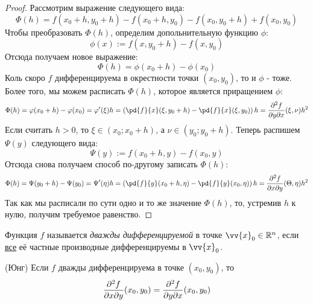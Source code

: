 \begin{proof}
	Рассмотрим выражение следующего вида:
	\[
		\Phi (h) = f(x_0 + h, y_0 + h) - f(x_0 + h, y_0) - f(x_0, y_0 + h) + f(x_0, y_0)
	\]
	Чтобы преобразовать $\Phi(h)$, определим допольнительную функцию $\phi$:
	\[
		\phi(x) := f(x, y_0 + h) - f(x, y_0)
	\]
	Отсюда получаем новое выражение:
	\[
		\Phi(h) = \phi(x_0 + h) - \phi(x_0)
	\]
	Коль скоро $f$ дифференцируема в окрестности точки $(x_0, y_0)$, то и $\phi$ - тоже. Более того, мы можем расписать $\Phi(h)$, которое является приращением $\phi$:
	\[
		\Phi(h) = \phi(x_0 + h) - \phi(x_0) = \phi'(\xi) h = \left(\pd{f}{x} (\xi, y_0 + h) - \pd{f}{x} (\xi, y_0)\right) h = \frac{\vdelta^2 f}{\vdelta y \vdelta x} (\xi, \nu) h^2
	\]
	Если считать $h > 0$, то $\xi \in (x_0; x_0 + h)$, а $\nu \in (y_0; y_0 + h)$. Теперь распишем $\Psi(y)$ следующего вида:
	\[
		\Psi(y) := f(x_0 + h, y) - f(x_0, y)
	\]
	Отсюда снова получаем способ по-другому записать $\Phi(h)$:
	\[
		\Phi(h) = \Psi(y_0 + h) - \Psi(y_0) = \Psi'(\eta) h = \left(\pd{f}{y} (x_0 + h, \eta) - \pd{f}{y} (x_0, \eta)\right) h = \frac{\vdelta^2 f}{\vdelta x \vdelta y} (\Theta, \eta) h^2
	\]
	Так как мы расписали по сути одно и то же значение $\Phi(h)$, то, устремив $h$ к нулю, получим требуемое равенство.
\end{proof}

\begin{definition}
	Функция $f$ называется \textit{дважды дифференцируемой} в точке $\vv{x}_0 \in \R^n$, если \underline{все} её частные производные дифференцируемы в $\vv{x}_0$.
\end{definition}

\begin{theorem} (Юнг)
	Если $f$ дважды дифференцируема в точке $(x_0, y_0)$, то
	\[
		\frac{\partial^2 f}{\partial x \partial y} (x_0, y_0) = \frac{\partial^2 f}{\partial y \partial x} (x_0, y_0)
	\]
\end{theorem}

